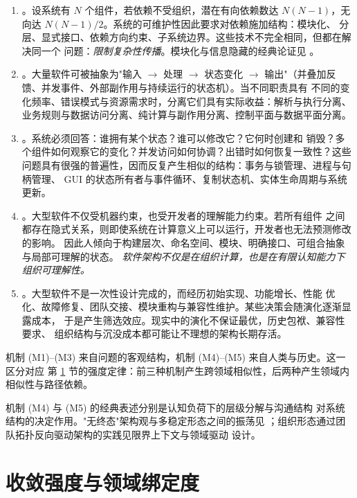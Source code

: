 \begin{enumerate}[label=(M\arabic*)]
\item {}。设系统有 $N$ 个组件，若依赖不受组织，潜在有向依赖数达
      $N(N-1)$，无向达 $N(N-1)/2$。系统的可维护性因此要求对依赖施加结构：模块化、
      分层、显式接口、依赖方向约束、子系统边界。这些技术不完全相同，但都在解决同一个
      问题：\emph{限制复杂性传播}。模块化与信息隐藏的经典论证见 \cite{parnas1972}。
\item {}。大量软件可被抽象为"输入 $\to$ 处理 $\to$ 状态变化 $\to$
      输出"（并叠加反馈、并发事件、外部副作用与持续运行的状态机）。当不同职责具有
      不同的变化频率、错误模式与资源需求时，分离它们具有实际收益：解析与执行分离、
      业务规则与数据访问分离、纯计算与副作用分离、控制平面与数据平面分离。
\item {}。系统必须回答：谁拥有某个状态？谁可以修改它？它何时创建和
      销毁？多个组件如何观察它的变化？并发访问如何协调？出错时如何恢复一致性？这些
      问题具有很强的普遍性，因而反复产生相似的结构：事务与锁管理、进程与句柄管理、
      GUI 的状态所有者与事件循环、复制状态机、实体生命周期与系统更新。
\item {}。大型软件不仅受机器约束，也受开发者的理解能力约束。若所有组件
      之间都存在隐式关系，则即使系统在计算意义上可以运行，开发者也无法预测修改的影响。
      因此人倾向于构建层次、命名空间、模块、明确接口、可组合抽象与局部可理解的状态。
      \emph{软件架构不仅是在组织计算，也是在有限认知能力下组织可理解性。}
\item {}。大型软件不是一次性设计完成的，而经历初始实现、功能增长、性能
      优化、故障修复、团队交接、模块重构与兼容性维护。某些决策会随演化逐渐显露成本，
      于是产生筛选效应。现实中的演化不保证最优，历史包袱、兼容性要求、
      组织结构与沉没成本都可能让不理想的架构长期存活。
\end{enumerate}

机制 (M1)--(M3) 来自问题的客观结构，机制 (M4)--(M5) 来自人类与历史。这一区分对应
第 \ref{sec:strength} 节的强度定律：前三种机制产生跨领域相似性，后两种产生领域内
相似性与路径依赖。

机制 (M4) 与 (M5) 的经典表述分别是认知负荷下的层级分解\cite{simon1962}与沟通结构
对系统结构的决定作用\cite{conway1968}。"无终态"架构观与多稳定形态之间的振荡见
\cite{nygard2018}；组织形态通过团队拓扑反向驱动架构的实践见限界上下文与领域驱动
设计\cite{evans2003}。

\section{收敛强度与领域绑定度}\label{sec:strength}

